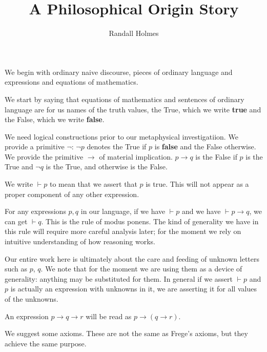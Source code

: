 \documentclass[12pt]{article}
\title{A Philosophical Origin Story}
\author{Randall Holmes}
\begin{document}
\maketitle

We begin with ordinary naive discourse, pieces of ordinary language and expressions and equations of mathematics.

We start by saying that equations of mathematics and sentences of ordinary language are for us names of the truth values, the True, which we write {\bf true}
and the False, which we write {\bf false}.

We need logical constructions prior to our metaphysical investigatiion.  We provide a primitive $\neg$:  $\neg p$ denotes the True if $p$ is {\bf false} and 
the False otherwise.  We provide the primitive $\rightarrow$ of material implication.  $p \rightarrow q$ is the False if $p$ is the True and $\neg q$ is the True, and otherwise is the False.

We write $\vdash p$ to mean that we assert that $p$ is true.  This will not appear as a proper component of any other expression.

For any expressions $p,q$ in our language, if we have $\vdash p$ and we have $\vdash p \rightarrow q$, we can get $\vdash q$.  This is the rule of modus ponens.  The kind of generality we have in this rule
will require more careful analysis later; for the moment we rely on intuitive understanding of how reasoning works.

Our entire work here is ultimately about the care and feeding of unknown letters such as $p$, $q$.  We note that for the moment we are using them as a device of generality:
anything may be substituted for them.  In general if we assert $\vdash p$ and $p$ is actually an expression with unknowns in it, we are asserting it for all values of the unknowns.

An expression $p\rightarrow q\rightarrow r$ will be read as $p \rightarrow (q \rightarrow r)$.

We suggest some axioms.  These are not the same as Frege's axioms, but they achieve the same purpose.
\end{document}
